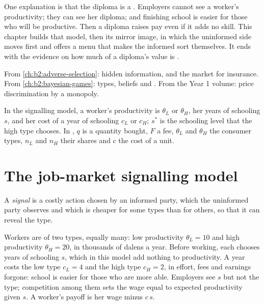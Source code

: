One explanation is that the diploma is a . Employers cannot see a worker's productivity; they can see her
diploma; and finishing school is easier for those who will be productive. Then a diploma raises pay even if it adds no
skill. This chapter builds that model, then its mirror image, in which the uninformed side moves first and offers a
menu that makes the informed sort themselves. It ends with the evidence on how much of a diploma's value is .

\begin{recall}
From \cref{ch:b2:adverse-selection}: hidden information,  and the market for insurance. From
\cref{ch:b2:bayesian-games}: types, beliefs and . From the Year 1 volume: price
discrimination by a monopoly.
\end{recall}

\begin{notation}\label{not:b2:signalling-and-screening:symbols}
In the signalling model, a worker's productivity is $\theta_L$ or $\theta_H$, her years of schooling $s$, and her cost of a year of
schooling $c_L$ or $c_H$; $s^*$ is the schooling level that the high type chooses. In , $q$ is a quantity bought,
$\mathit{F}$ a fee, $\theta_L$ and $\theta_H$ the consumer types, $n_L$ and $n_H$ their shares and $c$ the cost of a unit.
\end{notation}

\section{The job-market signalling model}\label{sec:b2:signalling-and-screening:signalling}

\begin{definition}[Signal]\label{def:b2:signalling-and-screening:signal}
A \emph{signal} is a costly action chosen by an informed party, which the uninformed party observes and
which is cheaper for some types than for others, so that it can reveal the type.
\end{definition}

Workers are of two types, equally many: low productivity $\theta_L = 10$ and high productivity $\theta_H = 20$, in thousands of
dalens a year. Before working, each chooses years of schooling $s$, which in this model add nothing to productivity. A
year costs the low type $c_L = 4$ and the high type $c_H = 2$, in effort, fees and earnings forgone: school is easier for
those who are more able. Employers see $s$ but not the type; competition among them sets the wage equal to expected
productivity given $s$. A worker's payoff is her wage minus $c\,s$.


